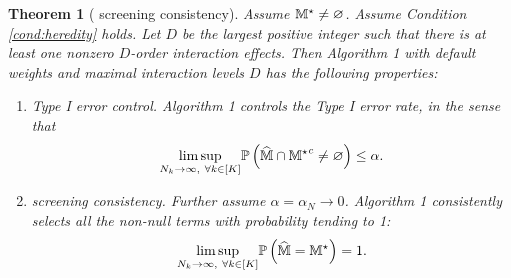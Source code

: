 \documentclass[12pt]{article}
\newtheorem{theorem}{Theorem}
\begin{document}
\begin{theorem}[ screening consistency]%

Assume ${\mathbb{M}}^\star\neq\varnothing$. Assume Condition \ref{cond:heredity} holds.  
Let $D$ be the largest positive integer such that there is at least one nonzero $D$-order interaction effects. Then Algorithm 1 with default weights and maximal interaction levels $D$ has the following properties:

\begin{enumerate}
    \item {\em Type I error control.} Algorithm 1 controls the Type I error rate, in the sense that 
    \begin{align}
        \underset{N_k\to\infty,~\forall k\in[K]}{\lim\sup}{\mathbb{P}}\left(\widehat{{\mathbb{M}}}\cap{{\mathbb{M}}^\star}^c\neq\varnothing\right)\le \alpha.
    \end{align}
    \item {\em  screening consistency.} Further assume $\alpha=\alpha_N\to0$. Algorithm 1 consistently selects all the non-null terms with probability tending to 1: 
    \begin{align}
        \underset{N_k\to\infty,~\forall k\in[K]}{\lim\sup}{\mathbb{P}}\left(\widehat{{\mathbb{M}}}={\mathbb{M}}^\star\right)=1.
    \end{align}
\end{enumerate}
\end{theorem}
\end{document}
